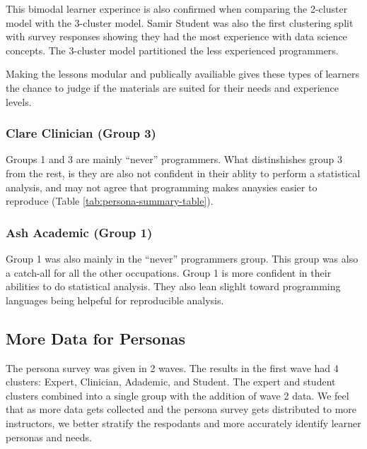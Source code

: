 \documentclass[020-persona\_validation.tex]{subfiles}
\begin{document}
            This bimodal learner experince is also confirmed when comparing the
            2-cluster model with the 3-cluster model. %
            Samir Student was also the first clustering split with survey responses showing
            they had the most experience with data science concepts.
            The 3-cluster model partitioned the less experienced programmers.

            Making the lessons modular and publically availiable
            gives these types of learners the chance to judge if the materials are suited for their needs
            and experience levels.

        \subsubsection{Clare Clinician (Group 3)}

            Groups 1 and 3 are mainly ``never'' programmers.
            What distinshishes group 3 from the rest, is they are also not confident in
            their ablity to perform a statistical analysis,
            and may not agree that programming makes anaysies easier to reproduce (Table \ref{tab:persona-summary-table}).

        \subsubsection{Ash Academic (Group 1)}

            Group 1 was also mainly in the ``never'' programmers group.
            This group was also a catch-all for all the other occupations.
            Group 1 is more confident in their abilities to do statistical analysis.
            They also lean slighlt toward programming languages being helpeful for reproducible analysis.

    \subsection{More Data for Personas}

        The persona survey was given in 2 waves.
        The results in the first wave had 4 clusters: Expert, Clinician, Adademic, and Student.
        The expert and student clusters combined into a single group with the addition of wave 2 data.
        We feel that as more data gets collected and the persona survey gets distributed to more
        instructors, we better stratify the respodants and more accurately identify learner personas and
        needs.
\end{document}
